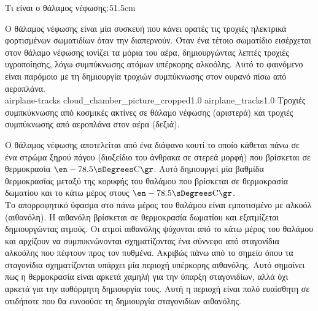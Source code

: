 
\begin{MyColumnCenter}[detach title,before upper={\tcbtitle\quad}]{Τι είναι ο θάλαμος νέφωσης$\bf{;}$}{51.5cm}

  Ο θάλαμος νέφωσης είναι μία συσκευή που κάνει ορατές τις τροχιές
  ηλεκτρικά φορτισμένων σωματιδίων όταν την διαπερνούν. Όταν ένα τέτοιο
  σωματίδιο εισέρχεται στον θάλαμο νέφωσης ιονίζει τα 
  μόρια του αέρα, δημιουργώντας λεπτές τροχιές υγροποίησης, λόγω
  συμπύκνωσης ατόμων υπέρκορης αλκοόλης. Αυτό το φαινόμενο είναι
  παρόμοιο με τη δημιουργία τροχιών συμπύκνωσης στον ουρανό πίσω από αεροπλάνα.\\
  \twoFigPoster
  {airplane-tracks}
  {cloud_chamber_picture_cropped}{1.0}
  {airplane_tracks}{1.0}
  {Τροχιές συμπκύκνωσης από κοσμικές ακτίνες σε θάλαμο νέφωσης (αριστερά) και τροχιές συμπύκνωσης από αεροπλάνα στον αέρα (δεξιά).}

  Ο θάλαμος νέφωσης αποτελείται από ένα διάφανο κουτί το
  οποίο κάθεται πάνω σε ένα στρώμα ξηρού πάγου (διοξείδιο του άνθρακα
  σε στερεά μορφή) που βρίσκεται σε θερμοκρασία $\en-78.5\sDegrees\mathrm{C}\gr$.
  Αυτό δημιουργεί μία βαθμίδα θερμοκρασίας μεταξύ της
  κορυφής του θαλάμου που βρίσκεται σε θερμοκρασία δωματίου και το κάτω μέρος
  στους $\en-78.5\sDegrees\mathrm{C}\gr$.\\

  Το απορροφητικό ύφασμα στο πάνω μέρος του θαλάμου είναι εμποτισμένο
  με αλκοόλ (αιθανόλη). Η αιθανόλη βρίσκεται σε
  θερμοκρασία δωματίου και εξατμίζεται δημιουργώντας ατμούς. 
  Οι ατμοί αιθανόλης ψύχονται από το κάτω μέρος του θαλάμου και αρχίζουν να
  συμπυκνώνονται σχηματίζοντας ένα σύννεφο από σταγονίδια αλκοόλης που
  πέφτουν προς τον πυθμένα. Ακριβώς πάνω από το σημείο όπου τα
  σταγονίδια σχηματίζονται υπάρχει μία περιοχή υπέρκορης
  αιθανόλης. Αυτό σημαίνει πως η θερμοκρασία 
  είναι αρκετά χαμηλή για την ύπαρξη σταγονιδίων, αλλά όχι αρκετά
  για την αυθόρμητη δημιουργία τους. Αυτή η περιοχή είναι πολύ
  ευαίσθητη σε οτιδήποτε που θα ευνοούσε τη δημιουργία σταγονιδίων
  αιθανόλης. \\


\end{MyColumnCenter}
